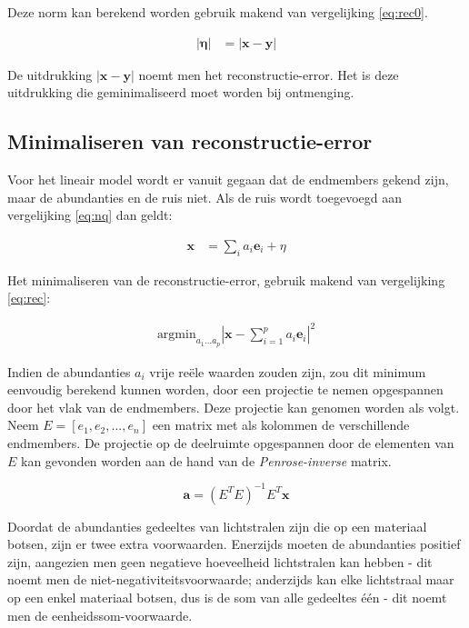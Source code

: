 \documentclass[12pt]{report}
\begin{document}
Deze norm kan berekend worden gebruik makend van vergelijking \ref{eq:rec0}.

\begin{eqnarray}
\left|\bm{\eta}\right| &= \left|\bm{x} - \bm{y}\right| \label{eq:rec}
\end{eqnarray}

De uitdrukking $\left|\bm{x} - \bm{y}\right|$ noemt men het reconstructie-error. Het is deze uitdrukking die geminimaliseerd moet worden bij ontmenging. 


\subsection{Minimaliseren van reconstructie-error}
Voor het lineair model wordt er vanuit gegaan dat de endmembers gekend zijn, maar de abundanties en de ruis niet. Als de ruis wordt toegevoegd aan vergelijking \ref{eq:nq} dan geldt:

\begin{align}
\bm{x} &= \sum_i a_i \bm{e}_i + \eta
\end{align}

Het minimaliseren van de reconstructie-error, gebruik makend van vergelijking \ref{eq:rec}:

\begin{align}
\text{argmin}_{a_1 ... a_p} \left| \bm{x} - \sum_{i=1}^p a_i \bm{e}_i\right|^2
\end{align}

Indien de abundanties $a_i$ vrije re\"ele waarden zouden zijn, zou dit minimum eenvoudig berekend kunnen worden, door een projectie te nemen opgespannen door het vlak van de endmembers. Deze projectie kan genomen worden als volgt. Neem $E = [e_1,e_2,...,e_n]$ een matrix met als kolommen de verschillende endmembers. De projectie op de deelruimte opgespannen door de elementen van $E$ kan gevonden worden aan de hand van de \textit{Penrose-inverse} matrix.

\begin{equation}
\bm{a} = (E^T E)^{-1} E^T \bm{x}
\end{equation}

Doordat de abundanties gedeeltes van lichtstralen zijn die op een materiaal botsen, zijn er twee extra voorwaarden. Enerzijds moeten de abundanties positief zijn, aangezien men geen negatieve hoeveelheid lichtstralen kan hebben - dit noemt men de niet-negativiteitsvoorwaarde; anderzijds kan elke lichtstraal maar op een enkel materiaal botsen, dus is de som van alle gedeeltes \'e\'en - dit noemt men de eenheidssom-voorwaarde.  
\end{document}
